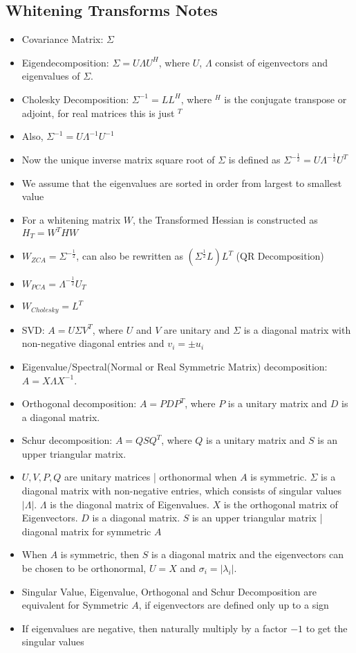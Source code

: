 \subsection{Whitening Transforms Notes}

\begin{itemize}

\item Covariance Matrix: $\Sigma$
\item Eigendecomposition: $\Sigma = U\Lambda U^{H}$, where $U$,  $\Lambda$ consist of eigenvectors and eigenvalues of $\Sigma$.
\item Cholesky Decomposition: $\Sigma^{-1} = LL^{H}$, where $^{H}$ is the conjugate transpose or adjoint, for real matrices this is just $^{T}$
\item Also, $\Sigma^{-1} = U \Lambda^{-1} U^{-1}$
\item Now the unique inverse matrix square root of $\Sigma$ is defined as  $\Sigma^{-\frac{1}{2}} = U\Lambda^{-\frac{1}{2}}U^{T}$
\item We assume that the eigenvalues are sorted in order from largest to smallest value
\item For a whitening matrix $W$, the Transformed Hessian is constructed as $H_{T} = W^{T}HW$
\item $W_{ZCA} = \Sigma^{-\frac{1}{2}}$, can also be rewritten as $(\Sigma^{\frac{1}{2}} L) L^{T}$ (QR Decomposition)
\item $W_{PCA} = \Lambda^{-\frac{1}{2}}U_{T}$
\item $W_{Cholesky} = L^{T}$
\item SVD: $A=U \Sigma V^T$, where $U$ and $V$ are unitary and $\Sigma$ is a diagonal matrix with non-negative diagonal entries and $v_i= \pm u_i$
\item Eigenvalue/Spectral(Normal or Real Symmetric Matrix) decomposition: $A=X \Lambda X^{-1}$.
\item Orthogonal decomposition: $A=P D P^T$, where $P$ is a unitary matrix and $D$ is a diagonal matrix.
\item Schur decomposition: $A=Q S Q^T$, where $Q$ is a unitary matrix and $S$ is an upper triangular matrix.
\item $U, V, P, Q$ are unitary matrices | orthonormal when $A$ is symmetric. $\Sigma$ is a diagonal matrix with non-negative entries, which consists of singular values $|\Lambda|$. $\Lambda$ is the diagonal matrix of Eigenvalues. $X$ is the orthogonal matrix of Eigenvectors. $D$ is a diagonal matrix. $S$ is an upper triangular matrix | diagonal matrix for symmetric $A$
\item When $A$ is symmetric, then $S$ is a diagonal matrix and the eigenvectors can be chosen to be orthonormal, $U=X$ and $\sigma_i=\left|\lambda_i\right|$.
\item Singular Value, Eigenvalue, Orthogonal and Schur Decomposition are equivalent for Symmetric $A$, if eigenvectors are defined only up to a sign
\item If eigenvalues are negative, then naturally multiply by a factor  $-1$ to get the singular values
\end{itemize}